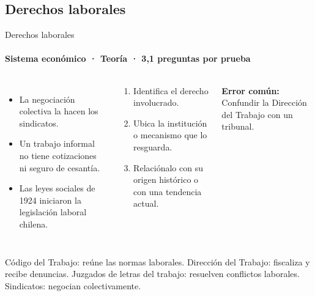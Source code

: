 \documentclass[aspectratio=169,11pt]{beamer}
\newlength{\ajustealto}
\newenvironment{ajustar}[1][0.74\textheight]
  {\setlength{\ajustealto}{#1}\begin{lrbox}{\ajustecaja}\begin{minipage}{\textwidth}}
  {\end{minipage}\end{lrbox}%
   \ifdim\dimexpr\ht\ajustecaja+\dp\ajustecaja\relax>\ajustealto
     \resizebox*{!}{\ajustealto}{\usebox{\ajustecaja}}\else\usebox{\ajustecaja}\fi}
\begin{document}
\subsection{Derechos laborales}

\begin{frame}{Derechos laborales}
\label{tema-hi-laborales}
\framesubtitle{Sistema económico · Teoría · 3,1 preguntas por prueba}
\begin{ajustar}
\begin{columns}[T,onlytextwidth]
\begin{itemize}\footnotesize
\item La negociación colectiva la hacen los sindicatos.
\item Un trabajo informal no tiene cotizaciones ni seguro de cesantía.
\item Las leyes sociales de 1924 iniciaron la legislación laboral chilena.
\end{itemize}
\begin{cajaregla}\scriptsize \begin{enumerate}\item Identifica el derecho involucrado.\item Ubica la institución o mecanismo que lo resguarda.\item Relaciónalo con su origen histórico o con una tendencia actual.\end{enumerate}\end{cajaregla}
\begin{notagris}\scriptsize \textbf{Error común:} Confundir la Dirección del Trabajo con un tribunal.\end{notagris}
\end{columns}
\begin{cajaclave}[Instituciones]\footnotesize
Código del Trabajo: reúne las normas laborales. Dirección del Trabajo: fiscaliza y recibe denuncias. Juzgados de letras del trabajo: resuelven conflictos laborales. Sindicatos: negocian colectivamente.
\end{cajaclave}
\end{ajustar}
\end{frame}
\end{document}
